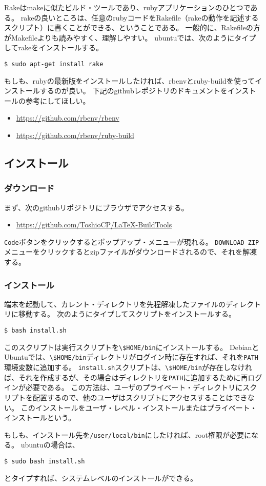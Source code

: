 Rakeはmakeに似たビルド・ツールであり、rubyアプリケーションのひとつである。
rakeの良いところは、任意のrubyコードをRakefile（rakeの動作を記述するスクリプト）に書くことができる、ということである。
一般的に、Rakefileの方がMakefileよりも読みやすく、理解しやすい。
ubuntuでは、次のようにタイプしてrakeをインストールする。
\begin{verbatim}
$ sudo apt-get install rake
\end{verbatim}

もしも、rubyの最新版をインストールしたければ、rbenvとruby-buildを使ってインストールするのが良い。
下記のgithubレポジトリのドキュメントをインストールの参考にしてほしい。
\begin{itemize}
\item \url{https://github.com/rbenv/rbenv}
\item \url{https://github.com/rbenv/ruby-build}
\end{itemize}

\subsection{インストール}
\subsubsection{ダウンロード}
まず、次のgithubリポジトリにブラウザでアクセスする。
\begin{itemize}
\item \url{https://github.com/ToshioCP/LaTeX-BuildTools}
\end{itemize}
\verb|Code|ボタンをクリックするとポップアップ・メニューが現れる。
\verb|DOWNLOAD ZIP|メニューをクリックするとzipファイルがダウンロードされるので、それを解凍する。
\subsubsection{インストール}
端末を起動して、カレント・ディレクトリを先程解凍したファイルのディレクトリに移動する。
次のようにタイプしてスクリプトをインストールする。
\begin{verbatim}
$ bash install.sh
\end{verbatim}
このスクリプトは実行スクリプトを\verb|\$HOME/bin|にインストールする。
DebianとUbuntuでは、\verb|\$HOME/bin|ディレクトリがログイン時に存在すれば、それを\verb|PATH|環境変数に追加する。
\verb|install.sh|スクリプトは、\verb|\$HOME/bin|が存在しなければ、それを作成するが、その場合はディレクトリを\verb|PATH|に追加するために再ログインが必要である。
この方法は、ユーザのプライベート・ディレクトリにスクリプトを配置するので、他のユーザはスクリプトにアクセスすることはできない。
このインストールをユーザ・レベル・インストールまたはプライベート・インストールという。

もしも、インストール先を\verb|/user/local/bin|にしたければ、root権限が必要になる。
ubuntuの場合は、
\begin{verbatim}
$ sudo bash install.sh
\end{verbatim}
とタイプすれば、システムレベルのインストールができる。
